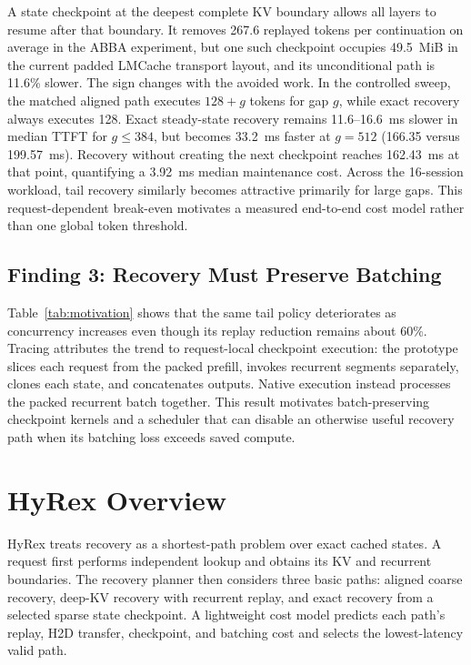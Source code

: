 \documentclass[sigconf,anonymous,review]{acmart}
\begin{document}
A state checkpoint at the deepest complete KV boundary allows all layers to
resume after that boundary.  It removes 267.6 replayed tokens per continuation
on average in the ABBA experiment, but one such checkpoint occupies 49.5~MiB
in the current padded LMCache transport layout, and its unconditional path is
11.6\% slower.  The sign changes with the avoided
work.  In the controlled sweep, the matched aligned path executes
$128+g$ tokens for gap $g$, while exact recovery always executes 128.  Exact
steady-state recovery remains 11.6--16.6~ms slower in median TTFT for
$g\le384$, but becomes 33.2~ms faster at $g=512$ (166.35 versus 199.57~ms).
Recovery without creating the next checkpoint reaches 162.43~ms at that point,
quantifying a 3.92~ms median maintenance cost.  Across the 16-session workload,
tail recovery similarly becomes attractive primarily for large gaps.  This
request-dependent break-even motivates a measured end-to-end cost model rather
than one global token threshold.

\subsection{Finding 3: Recovery Must Preserve Batching}

Table~\ref{tab:motivation} shows that the same tail policy deteriorates as
concurrency increases even though its replay reduction remains about 60\%.
Tracing attributes the trend to request-local checkpoint execution: the
prototype slices each request from the packed prefill, invokes recurrent
segments separately, clones each state, and concatenates outputs.  Native
execution instead processes the packed recurrent batch together.  This result
motivates batch-preserving checkpoint kernels and a scheduler that can disable
an otherwise useful recovery path when its batching loss exceeds saved compute.

\section{HyRex Overview}
\label{sec:overview}

HyRex treats recovery as a shortest-path problem over exact cached states.  A
request first performs independent lookup and obtains its KV and recurrent
boundaries.  The recovery planner then considers three basic paths: aligned
coarse recovery, deep-KV recovery with recurrent replay, and exact recovery from
a selected sparse state checkpoint.  A lightweight cost model predicts each
path's replay, H2D transfer, checkpoint, and batching cost and selects the
lowest-latency valid path.
\end{document}
